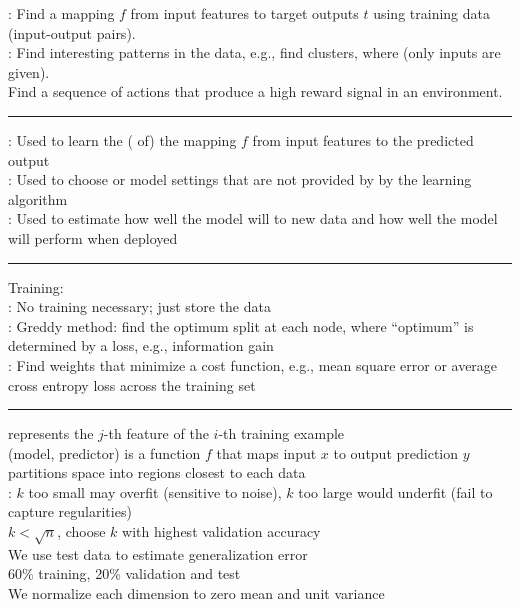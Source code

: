 \documentclass[10pt]{CheatSheet/hw}
\begin{document}
\begin{multicols*}{5}
: Find a mapping $f$ from input features  to target outputs $t$ using  training data (input-output pairs).\\
: Find interesting patterns in the data, e.g., find clusters, where  (only inputs are given).\\
 Find a sequence of actions that produce a high reward signal in an environment.\\
\rule{\linewidth}{0.4pt}
: Used to learn the ( of) the mapping $f$ from input features to the predicted output\\
: Used to choose  or model settings that are not provided by by the learning algorithm\\
: Used to estimate how well the model will  to new data and how well the model will perform when deployed\\
\rule{\linewidth}{0.4pt}
Training:\\
: No training necessary; just store the data \\
: Greddy method: find the optimum split at each node, where ``optimum'' is determined by a loss, e.g., information gain\\
: Find weights  that minimize a cost function, e.g., mean square error or average cross entropy loss across the training set\\
\rule{\linewidth}{0.4pt}
 represents the $j$-th feature of the $i$-th training example\\
 (model, predictor) is a function $f$ that maps input $x$ to output prediction $y$\\
 partitions space into regions closest to each data\\
: $k$ too small may overfit (sensitive to noise), $k$ too large would underfit (fail to capture regularities)\\
$k<\sqrt{n}$, choose $k$ with highest validation accuracy\\
We use test data to estimate generalization error\\
60\% training, 20\% validation and test\\
We normalize each dimension to zero mean and unit variance\\

\end{multicols*}
\end{document}
